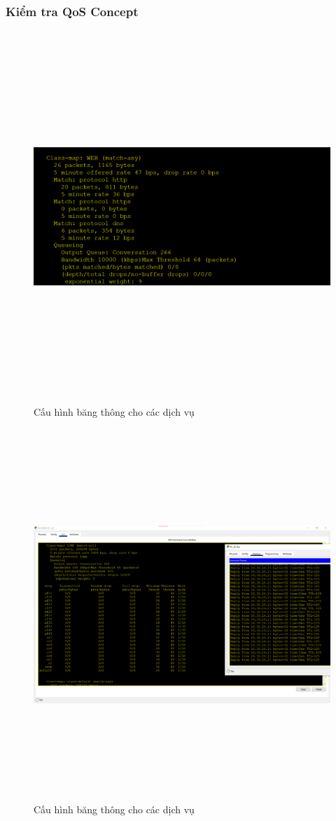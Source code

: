 \documentclass[a4paper, 12pt]{article}
\begin{document}
\subsubsection{Kiểm tra QoS Concept}
\begin{figure}[H]
    \centering
    \includegraphics[width=16cm, height=14cm]{img/qos1.png}
    \caption{Cấu hình băng thông cho các dịch vụ}
    \label{qos1}
\end{figure}
\begin{figure}[H]
    \centering
    \includegraphics[width=16cm, height=14cm]{img/qos2.png}
    \caption{Cấu hình băng thông cho các dịch vụ}
    \label{qos2}
\end{figure}
\cleardoublepage
\end{document}
